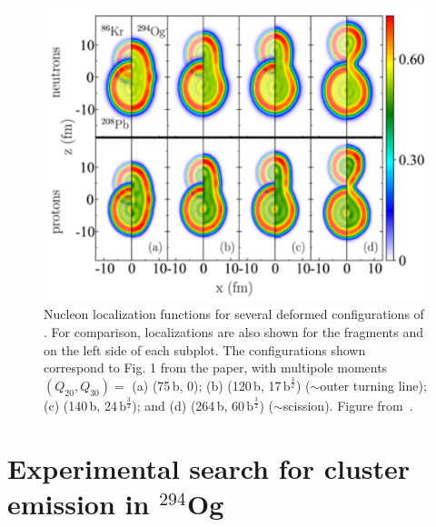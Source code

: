 \begin{figure}
	\includegraphics[width=0.9\linewidth]{TeX_files/294Og_locali}
	\caption{Nucleon localization functions for several deformed configurations of {\Og}. For comparison, localizations are also shown for the fragments {\Pb} and {\Kr} on the left side of each subplot. The configurations shown correspond to Fig. 1 from the paper, with multipole moments $(Q_{20}, Q_{30})=$ (a) (75\,b, 0); (b) (120\,b, 17\,$\mathrm{b}^\frac{3}{2}$) (${\sim}$outer turning line); (c) (140\,b, 24\,$\mathrm{b}^\frac{3}{2}$); and (d) (264\,b, 60\,$\mathrm{b}^\frac{3}{2}$) (${\sim}$scission). Figure from~\cite{matheson2019}.}
	\label{fig:294oglocali}
\end{figure}



\section{Experimental search for cluster emission in $^{294}$Og}

